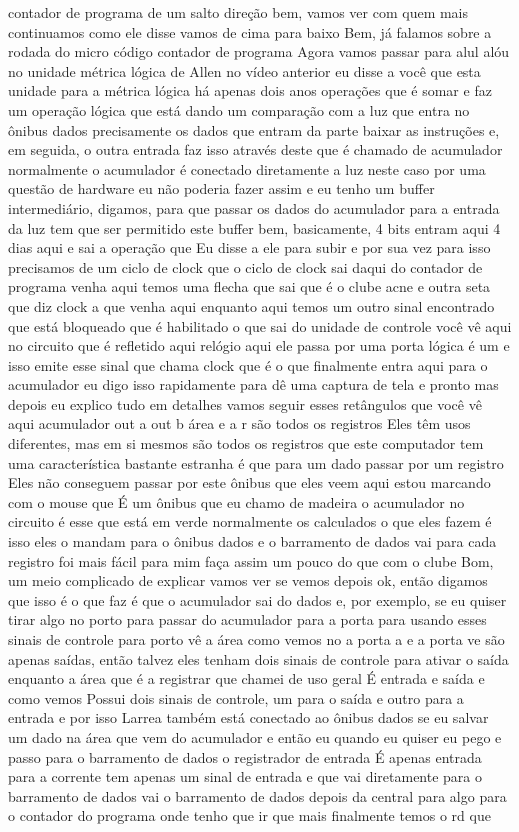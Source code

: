 \documentclass[oneside,11pt]{memoir} %
\begin{document}
contador de programa de um salto  direção  bem, vamos ver com quem mais continuamos como  ele disse vamos de cima para baixo  Bem, já falamos sobre a rodada do micro  código contador de programa  Agora vamos passar para alul alóu no  unidade métrica lógica de Allen no vídeo  anterior eu disse a você que esta unidade  para a métrica lógica há apenas dois anos  operações que é somar e faz um  operação lógica que está dando um  comparação com a luz que entra no ônibus  dados  precisamente os dados que entram da parte  baixar as instruções e, em seguida, o  outra entrada faz isso através deste  que é chamado de acumulador normalmente  o acumulador é conectado diretamente a  luz neste caso por uma questão de  hardware eu não poderia fazer assim e eu tenho um  buffer intermediário, digamos, para que  passar os dados do acumulador para a entrada  da luz tem que ser permitido  este buffer  bem, basicamente, 4 bits entram aqui  4 dias aqui e sai a operação que  Eu disse a ele para subir e por sua vez  para isso precisamos de um  ciclo de clock que o ciclo de clock sai  daqui do contador de programa venha aqui  temos uma flecha que sai que é o  clube  acne e outra seta que diz clock a que  venha aqui enquanto aqui temos um  outro sinal encontrado que está bloqueado  que é habilitado o que sai do  unidade de controle você vê aqui no  circuito que é refletido aqui relógio  aqui ele passa por uma porta lógica é um  e isso emite esse sinal que chama clock  que é o que finalmente entra aqui para o  acumulador eu digo isso rapidamente para  dê uma captura de tela e pronto  mas depois eu explico  tudo em detalhes  vamos seguir esses retângulos que você vê aqui  acumulador out a out b área e a r são  todos os registros  Eles têm usos diferentes, mas em si mesmos são  todos os registros que este computador tem  uma característica bastante estranha  é que para um dado passar por um registro  Eles não conseguem passar por este ônibus que eles veem  aqui estou marcando com o mouse que  É um ônibus que eu chamo de madeira o  acumulador no circuito é esse que  está em verde normalmente os calculados  o que eles fazem é isso eles o mandam para o ônibus  dados e o barramento de dados vai para cada  registro foi mais fácil para mim  faça assim um pouco do que com o clube  Bom, um meio complicado de explicar  vamos ver se vemos depois  ok, então digamos que isso é o que  faz é que o acumulador sai do  dados e, por exemplo, se eu quiser tirar  algo no porto para  passar do acumulador para a porta para  usando esses sinais de controle para  porto vê a área como vemos no  a porta a e a porta ve são apenas  saídas, então talvez eles tenham dois  sinais de controle para ativar o  saída enquanto a área que é a  registrar que chamei de uso geral  É entrada e saída e como vemos  Possui dois sinais de controle, um para o  saída e outro para a entrada e por isso  Larrea também está conectado ao ônibus  dados  se eu salvar um dado na área  que vem do acumulador e então eu  quando eu quiser eu pego e passo  para o barramento de dados o registrador de entrada  É apenas entrada para a corrente  tem apenas um sinal de entrada e  que vai diretamente para o barramento de dados  vai o barramento de dados depois da central para  algo para o contador do programa onde  tenho que ir  que mais finalmente temos o rd que  
\end{document}
